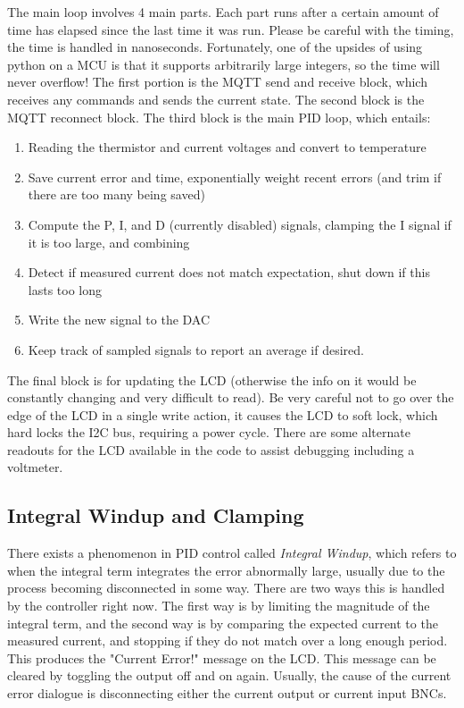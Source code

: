 \documentclass[11pt, letterpaper]{article}
\begin{document}
The main loop involves 4 main parts. Each part runs after a certain amount of time has elapsed since the last time it was run. Please be careful with the timing, the time is handled in nanoseconds. Fortunately, one of the upsides of using python on a MCU is that it supports arbitrarily large integers, so the time will never overflow! The first portion is the MQTT send and receive block, which receives any commands and sends the current state. The second block is the MQTT reconnect block. The third block is the main PID loop, which entails:

\begin{enumerate}
    \item Reading the thermistor and current voltages and convert to temperature
    \item Save current error and time, exponentially weight recent errors (and trim if there are too many being saved)
    \item Compute the P, I, and D (currently disabled) signals, clamping the I signal if it is too large, and combining
    \item Detect if measured current does not match expectation, shut down if this lasts too long
    \item Write the new signal to the DAC
    \item Keep track of sampled signals to report an average if desired.
\end{enumerate}

The final block is for updating the LCD (otherwise the info on it would be constantly changing and very difficult to read). Be very careful not to go over the edge of the LCD in a single write action, it causes the LCD to soft lock, which hard locks the I2C bus, requiring a power cycle. There are some alternate readouts for the LCD available in the code to assist debugging including a voltmeter. 

\subsection{Integral Windup and Clamping}
There exists a phenomenon in PID control called {\it Integral Windup}, which refers to when the integral term integrates the error abnormally large, usually due to the process becoming disconnected in some way. There are two ways this is handled by the controller right now. The first way is by limiting the magnitude of the integral term, and the second way is by comparing the expected current to the measured current, and stopping if they do not match over a long enough period. This produces the "Current Error!" message on the LCD. This message can be cleared by toggling the output off and on again. Usually, the cause of the current error dialogue is disconnecting either the current output or current input BNCs.
\end{document}
